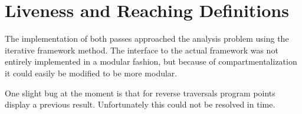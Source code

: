 \documentclass[12pt]{article}
\begin{document}
\section{Liveness and Reaching Definitions}

The implementation of both passes approached the analysis problem using the
iterative framework method. The interface to the actual framework was not
entirely implemented in a modular fashion, but because of compartmentalization
it could easily be modified to be more modular.

One slight bug at the moment is that for reverse traversals program points
display a previous result. Unfortunately this could not be resolved in time.

{\tiny }

{\tiny }
\end{document}
